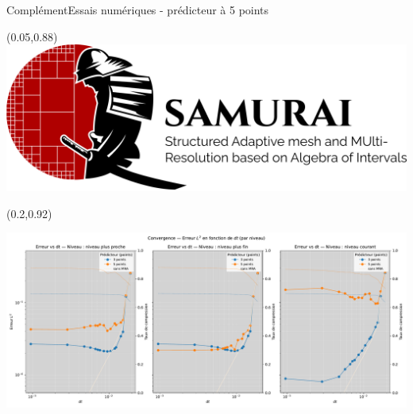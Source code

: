 \begin{frame}{Complément}{Essais numériques - prédicteur à 5 points}
    \begin{textblock*}{40pt}(0.05\paperwidth,0.88\paperheight)\includegraphics[scale=.03]{medias/2_/1_/light_logo.png}\end{textblock*}
    \begin{textblock*}{40pt}(0.2\paperwidth,0.92\paperheight)
        {\color{black}{+ Ponio}}
    \end{textblock*}
    \includegraphics[width = \textwidth]{medias/3_/error_vs_dt_by_stencil_per_mlf.pdf}
\end{frame}